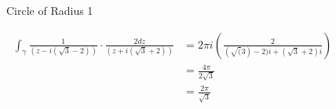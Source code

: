 \begin{example}
\begin{figure}[H]
        \caption{Circle of Radius 1}
    \end{figure}
    \begin{align*}
        \int_{\gamma} \frac{1}{(z - i(\sqrt{3} - 2))}\cdot \frac{2dz}{(z + i(\sqrt{3} + 2))} & = 2\pi i \left(\frac{2}{(\sqrt(3)-2)i + (\sqrt{3} + 2)i}\right) \\
                                                                                             & = \frac{4\pi}{2\sqrt{3}}                                        \\
                                                                                             & = \frac{2\pi}{\sqrt{3}}
    \end{align*}
\end{example}